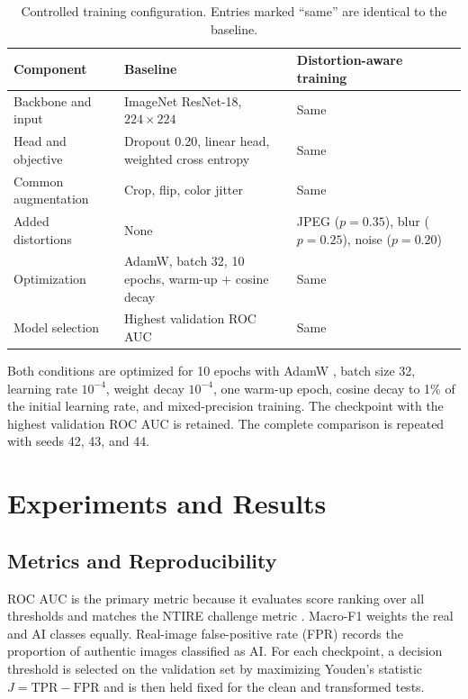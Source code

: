 \documentclass[conference]{IEEEtran}
\begin{document}
\begin{table}[!t]
\centering
\caption{Controlled training configuration. Entries marked ``same'' are
identical to the baseline.}
\label{tab:config}
\setlength{\tabcolsep}{5pt}
\begin{tabular}{lll}
\toprule
Component & Baseline & Distortion-aware training \\
\midrule
Backbone and input & ImageNet ResNet-18, $224\times224$ & Same \\
Head and objective & Dropout 0.20, linear head, weighted cross entropy & Same \\
Common augmentation & Crop, flip, color jitter & Same \\
Added distortions & None & JPEG ($p=0.35$), blur ($p=0.25$), noise ($p=0.20$) \\
Optimization & AdamW, batch 32, 10 epochs, warm-up + cosine decay & Same \\
Model selection & Highest validation ROC AUC & Same \\
\bottomrule
\end{tabular}
\end{table}

Both conditions are optimized for 10 epochs with AdamW
\cite{loshchilov2019adamw}, batch size 32, learning rate $10^{-4}$, weight
decay $10^{-4}$, one warm-up epoch, cosine decay to 1\% of the initial learning
rate, and mixed-precision training. The checkpoint with the highest validation
ROC AUC is retained. The complete comparison is repeated with seeds 42, 43,
and 44.

\section{Experiments and Results}
\label{sec:results}

\subsection{Metrics and Reproducibility}

ROC AUC is the primary metric because it evaluates score ranking over all
thresholds and matches the NTIRE challenge metric \cite{gushchin2026ntire}.
Macro-F1 weights the real and AI classes equally. Real-image false-positive
rate (FPR) records the proportion of authentic images classified as AI. For
each checkpoint, a decision threshold is selected on the validation set by
maximizing Youden's statistic $J=\mathrm{TPR}-\mathrm{FPR}$ and is then held
fixed for the clean and transformed tests.
\end{document}
